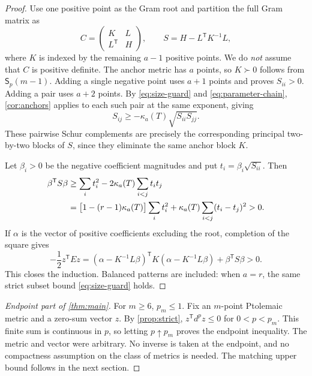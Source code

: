 \documentclass[11pt,a4paper]{article}
\theoremstyle{definition}
\theoremstyle{remark}
\numberwithin{equation}{section}
\newcommand{\stp}{\mathsf{S}_p}
\newcommand{\tr}{^{\mathsf T}}
\begin{document}
\begin{proof}
Use one positive point as the Gram root and partition the full Gram matrix as
\[
 C=\begin{pmatrix}K&L\\L\tr&H\end{pmatrix},
 \qquad S=H-L\tr K^{-1}L,
\]
where $K$ is indexed by the remaining $a-1$ positive points. We do \emph{not} assume that $C$ is positive definite. The anchor metric has $a$ points, so $K\succ0$ follows from $\stp(m-1)$. Adding a single negative point uses $a+1$ points and proves $S_{ii}>0$. Adding a pair uses $a+2$ points. By \eqref{eq:size-guard} and \eqref{eq:parameter-chain}, \cref{cor:anchors} applies to each such pair at the same exponent, giving
\[
 S_{ij}\ge-\kappa_a(T)\sqrt{S_{ii}S_{jj}}.
\]
These pairwise Schur complements are precisely the corresponding principal two-by-two blocks of $S$, since they eliminate the same anchor block $K$.

Let $\beta_i>0$ be the negative coefficient magnitudes and put $t_i=\beta_i\sqrt{S_{ii}}$. Then
\begin{align}
 \beta\tr S\beta
 &\ge\sum_i t_i^2-2\kappa_a(T)\sum_{i<j}t_it_j\notag\\
 &=\bigl[1-(r-1)\kappa_a(T)\bigr]\sum_i t_i^2
   +\kappa_a(T)\sum_{i<j}(t_i-t_j)^2
 >0.\label{eq:copositive}
\end{align}
If $\alpha$ is the vector of positive coefficients excluding the root, completion of the square gives
\begin{equation}\label{eq:completion}
 -\frac12z\tr Ez
 =(\alpha-K^{-1}L\beta)\tr K(\alpha-K^{-1}L\beta)
   +\beta\tr S\beta>0.
\end{equation}
This closes the induction. Balanced patterns are included: when $a=r$, the same strict subset bound \eqref{eq:size-guard} holds.
\end{proof}

\begin{proof}[Endpoint part of \cref{thm:main}]
For $m\ge6$, $p_m\le1$. Fix an $m$-point Ptolemaic metric and a zero-sum vector $z$. By \cref{prop:strict}, $z\tr d^pz\le0$ for $0<p<p_m$. This finite sum is continuous in $p$, so letting $p\uparrow p_m$ proves the endpoint inequality. The metric and vector were arbitrary. No inverse is taken at the endpoint, and no compactness assumption on the class of metrics is needed. The matching upper bound follows in the next section.
\end{proof}
\end{document}
